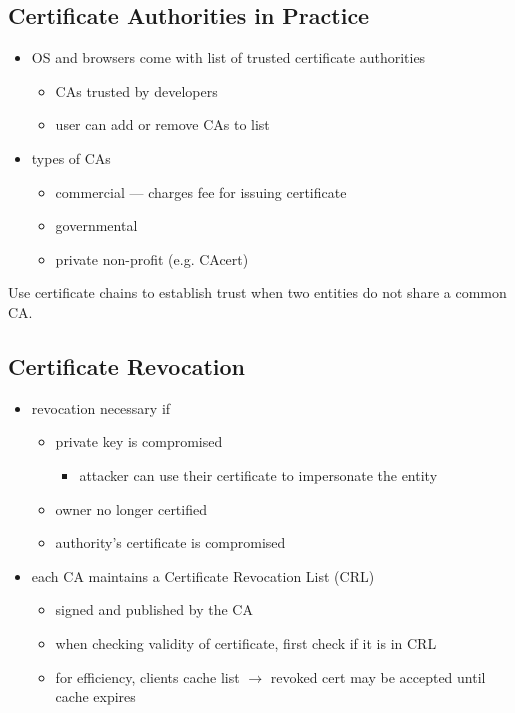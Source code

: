 \documentclass[final]{article}
\begin{document}
\subsection{Certificate Authorities in Practice}
\begin{itemize}[nosep]
    \item OS and browsers come with list of trusted certificate authorities
          \begin{itemize}[nosep]
              \item CAs trusted by developers
              \item user can add or remove CAs to list
          \end{itemize}
    \item types of CAs
          \begin{itemize}[nosep]
              \item commercial --- charges fee for issuing certificate
              \item governmental
              \item private non-profit (e.g. CAcert)
          \end{itemize}
\end{itemize}
Use certificate chains to establish trust when two entities do not share a common CA.

\subsection{Certificate Revocation}
\begin{itemize}[nosep]
    \item revocation necessary if
          \begin{itemize}[nosep]
              \item private key is compromised
                    \begin{itemize}[nosep]\item attacker can use their certificate to impersonate the entity\end{itemize}
              \item owner no longer certified
              \item authority's certificate is compromised
          \end{itemize}
    \item each CA maintains a Certificate Revocation List (CRL)
          \begin{itemize}[nosep]
              \item signed and published by the CA
              \item when checking validity of certificate, first check if it is in CRL
              \item for efficiency, clients cache list $\rightarrow$ revoked cert may be accepted until cache expires
          \end{itemize}
\end{itemize}
\clearpage

\glsaddall
\printglossary[nonumberlist]
\printglossary[nonumberlist,type=\acronymtype]
\end{document}
